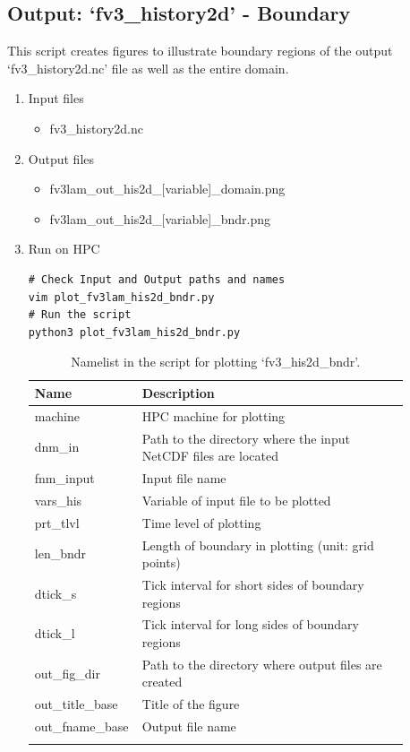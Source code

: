\documentclass[11pt,fleqn]{report}              %
\begin{document}
\subsection{Output: `fv3\_history2d' - Boundary}
\label{subsec:python_his2d_bndr}

This script creates figures to illustrate boundary regions of the output `fv3\_history2d.nc' file as well as the entire domain.

\begin{enumerate}
\item Input files
\begin{itemize}
\item fv3\_history2d.nc
\end{itemize}
\item Output files
\begin{itemize}
\item fv3lam\_out\_his2d\_[variable]\_domain.png
\item fv3lam\_out\_his2d\_[variable]\_bndr.png
\end{itemize}
\item Run on HPC

\lstset{language=bash}   
\begin{lstlisting}[frame=trBL]
# Check Input and Output paths and names
vim plot_fv3lam_his2d_bndr.py
# Run the script
python3 plot_fv3lam_his2d_bndr.py
\end{lstlisting}

{
\fontsize{10}{12}\selectfont
\begin{longtable}{ p{0.17\linewidth} | p{0.7\linewidth} }
\hline
\hline
Name & Description \\
\hline
 machine & HPC machine for plotting \\
 dnm\_in & Path to the directory where the input NetCDF files are located   \\
 fnm\_input & Input file name \\
 vars\_his & Variable of input file to be plotted \\
 prt\_tlvl & Time level of plotting \\
 len\_bndr & Length of boundary in plotting (unit: grid points) \\
 dtick\_s & Tick interval for short sides of boundary regions \\
 dtick\_l & Tick interval for long sides of boundary regions \\
 out\_fig\_dir & Path to the directory where output files are created \\
 out\_title\_base & Title of the figure \\
 out\_fname\_base & Output file name \\
\hline
\caption{Namelist in the script for plotting `fv3\_his2d\_bndr'.}
\label{table:fv3_var_dyn}
\end{longtable}
}


\end{enumerate}
\end{document}
